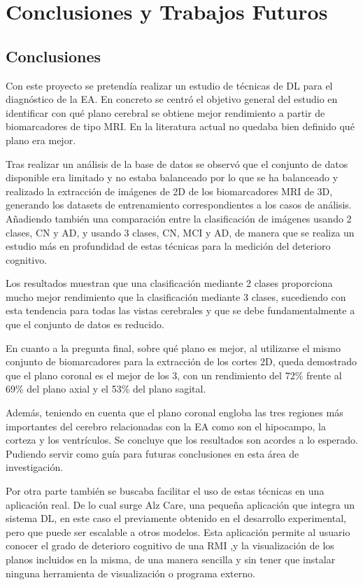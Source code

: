 \chapter{Conclusiones y Trabajos Futuros}\label{ch:conclusiones-y-trabajos-futuros}

\section{Conclusiones}\label{sec:conclusiones}
Con este proyecto se pretendía realizar un estudio de técnicas de DL para el diagnóstico de la EA.
En concreto se centró el objetivo general del estudio en identificar con qué plano cerebral se obtiene mejor rendimiento
a partir de biomarcadores de tipo MRI. En la literatura actual no quedaba bien definido qué plano era mejor.

Tras realizar un análisis de la base de datos se observó que el conjunto de datos disponible era limitado y no estaba
balanceado por lo que se ha balanceado y realizado la extracción de imágenes de 2D de los biomarcadores MRI de 3D,
generando los datasets de entrenamiento correspondientes a los casos de análisis.
Añadiendo también una comparación entre la clasificación de imágenes usando 2 clases, CN y AD, y usando 3 clases, CN,
MCI y AD, de manera que se realiza un estudio más en profundidad de estas técnicas para la medición del deterioro
cognitivo.

Los resultados muestran que una clasificación mediante 2 clases proporciona mucho mejor rendimiento que la clasificación
mediante 3 clases, sucediendo con esta tendencia para todas las vistas cerebrales y que se debe fundamentalmente a que
el conjunto de datos es reducido.

En cuanto a la pregunta final, sobre qué plano es mejor, al utilizarse el mismo conjunto de biomarcadores para la
extracción de los cortes 2D, queda demostrado que el plano coronal es el mejor de los 3, con un rendimiento del 72\%
frente al 69\% del plano axial y el 53\% del plano sagital.

Además, teniendo en cuenta que el plano coronal engloba las tres regiones más importantes del cerebro relacionadas con
la EA como son el hipocampo, la corteza y los ventrículos.
Se concluye que los resultados son acordes a lo esperado.
Pudiendo servir como guía para futuras conclusiones en esta área de investigación.

Por otra parte también se buscaba facilitar el uso de estas técnicas en una aplicación real.
De lo cual surge Alz Care, una pequeña aplicación que integra un sistema DL, en este caso el
previamente obtenido en el desarrollo experimental, pero que puede ser escalable a otros modelos.
Esta aplicación permite al usuario conocer el grado de deterioro cognitivo de una RMI ,y la visualización
de los planos incluidos en la misma, de una manera sencilla y sin tener que instalar ninguna herramienta de
visualización o programa externo.

